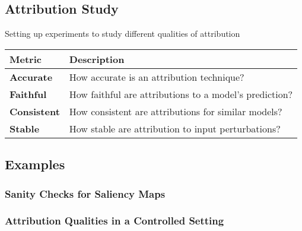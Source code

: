 \subsection{Attribution Study}
\begin{summary} Setting up experiments to study different qualities of attribution
    \vspace{1em}
    \begin{center}
        \begin{tabular}{ll}
            \toprule
            \textbf{Metric} & \textbf{Description} \\
            \midrule
            \textbf{Accurate} & How accurate is an attribution technique? \\
            \midrule
            \textbf{Faithful} & How faithful are attributions to a model's prediction?\\
            \midrule
            \textbf{Consistent} & How consistent are attributions for similar models?\\
            \midrule
            \textbf{Stable} & How stable are attribution to input perturbations? \\
            \bottomrule
        \end{tabular}
    \end{center}    
\end{summary}
\newpage

\subsection{Examples}
\subsubsection{Sanity Checks for Saliency Maps}
\begin{example}
\end{example}
\newpage

\subsubsection{Attribution Qualities in a Controlled Setting}
\begin{example}
    
\end{example}
\newpage

